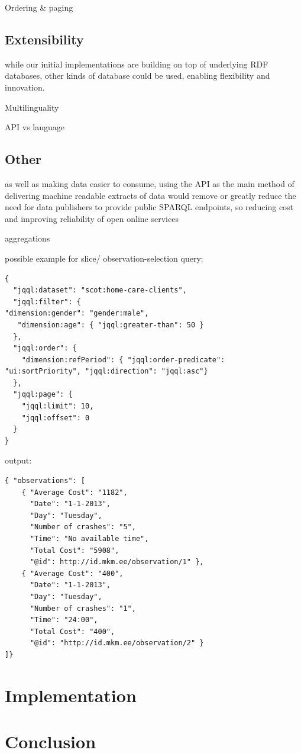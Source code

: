 \documentclass{llncs}
\begin{document}
Ordering \& paging


\subsection{Extensibility}
while our initial implementations are building on top of underlying RDF databases, other kinds of database could be used, enabling flexibility and innovation. 

Multilinguality

API vs language

\subsection{Other}


as well as making data easier to consume, using the API as the main method of delivering machine readable extracts of data would remove or greatly reduce the need for data publishers to provide public SPARQL endpoints, so reducing cost and improving reliability of open online services

aggregations


possible example for slice/ observation-selection query:
\begin{verbatim} 
{ 
  "jqql:dataset": "scot:home-care-clients",
  "jqql:filter": {
"dimension:gender": "gender:male",
   "dimension:age": { "jqql:greater-than": 50 }
  },
  "jqql:order": {
    "dimension:refPeriod": { "jqql:order-predicate": "ui:sortPriority", "jqql:direction": "jqql:asc"}
  },
  "jqql:page": {
    "jqql:limit": 10,
    "jqql:offset": 0
  }
}
\end{verbatim}

output:
\begin{verbatim} 
{ "observations": [ 
	{ "Average Cost": "1182", 
   	  "Date": "1-1-2013", 
	  "Day": "Tuesday", 
	  "Number of crashes": "5",
	  "Time": "No available time",
      "Total Cost": "5908", 
	  "@id": http://id.mkm.ee/observation/1" }, 
	{ "Average Cost": "400",
	  "Date": "1-1-2013",
	  "Day": "Tuesday",
	  "Number of crashes": "1",
	  "Time": "24:00",
 	  "Total Cost": "400",
	  "@id": "http://id.mkm.ee/observation/2" }
]}
\end{verbatim}

\section{Implementation}\label{sec:impl}

\section{Conclusion}\label{sec:conclusion}






\end{document}
